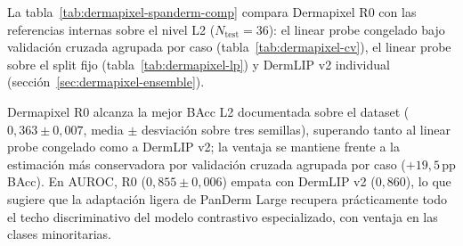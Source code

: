 La tabla~\ref{tab:dermapixel-spanderm-comp} compara Dermapixel R0 con
las referencias internas sobre el nivel L2 ($N_{\mathrm{test}} = 36$):
el linear probe congelado bajo validación cruzada agrupada por caso
(tabla~\ref{tab:dermapixel-cv}), el linear probe sobre el split
fijo (tabla~\ref{tab:dermapixel-lp}) y DermLIP v2 individual
(sección~\ref{sec:dermapixel-ensemble}).

\begin{table}[htbp]
\centering
\footnotesize
\setlength{\tabcolsep}{4pt}
\renewcommand{\arraystretch}{0.95}
\caption{Comparativa sobre el nivel L2 de DermapixelAI~1.0
($38$ clases con queratinización consolidada,
$N_{\mathrm{test}} = 36$) entre Dermapixel R0 y las referencias
internas del trabajo. La fila LP CV se considera la cifra honesta
del linear probe congelado por su independencia del \emph{split}
fijo y por su anclaje en validación cruzada agrupada por caso
(sección~\ref{sec:dermapixel-results}). Mejor valor por
columna en negrita.}
\label{tab:dermapixel-spanderm-comp}
\end{table}

Dermapixel R0 alcanza la mejor BAcc L2 documentada sobre el dataset
($0{,}363 \pm 0{,}007$, media $\pm$ desviación sobre tres semillas),
superando tanto al linear probe congelado como a DermLIP v2; la
ventaja se mantiene frente a la estimación más conservadora por
validación cruzada agrupada por caso ($+19{,}5$\,pp BAcc). En AUROC,
R0 ($0{,}855 \pm 0{,}006$) empata con DermLIP v2 ($0{,}860$), lo que
sugiere que la adaptación ligera de PanDerm Large recupera
prácticamente todo el techo discriminativo del modelo contrastivo
especializado, con ventaja en las clases minoritarias.

